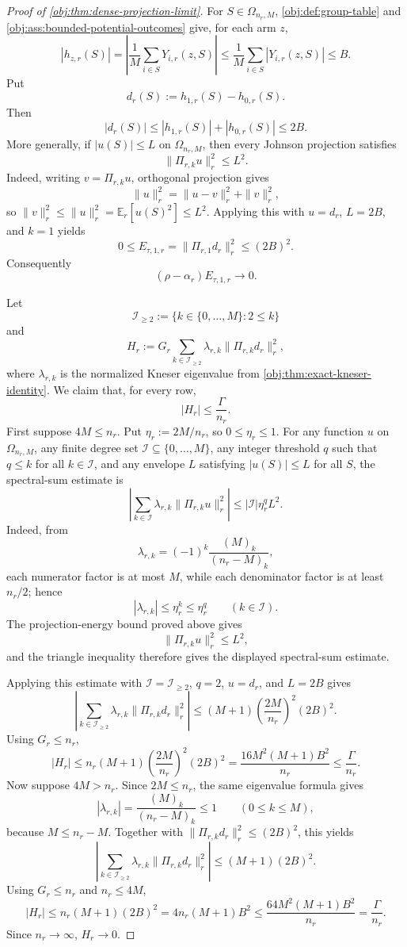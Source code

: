 \documentclass[11pt]{article}
\begin{document}
\begin{proof}[Proof of \cref{obj:thm:dense-projection-limit}]
For \(S\in\Omega_{n_r,M}\), \cref{obj:def:group-table} and \cref{obj:ass:bounded-potential-outcomes} give, for each arm \(z\),
\[
|h_{z,r}(S)|
=
\left|
\frac1M\sum_{i\in S}Y_{i,r}(z,S)
\right|
\le
\frac1M\sum_{i\in S}|Y_{i,r}(z,S)|
\le B .
\]
Put
\[
d_r(S):=h_{1,r}(S)-h_{0,r}(S).
\]
Then
\[
|d_r(S)|\le |h_{1,r}(S)|+|h_{0,r}(S)|\le 2B .
\]
More generally, if \(|u(S)|\le L\) on \(\Omega_{n_r,M}\), then every Johnson projection satisfies
\[
\|\Pi_{r,k}u\|_r^2\le L^2 .
\]
Indeed, writing \(v=\Pi_{r,k}u\), orthogonal projection gives
\[
\|u\|_r^2=\|u-v\|_r^2+\|v\|_r^2,
\]
so \(\|v\|_r^2\le \|u\|_r^2=\mathbb E_r[u(S)^2]\le L^2\).  Applying this with \(u=d_r\), \(L=2B\), and \(k=1\) yields
\[
0\le E_{\tau,1,r}
=
\|\Pi_{r,1}d_r\|_r^2
\le (2B)^2 .
\]
Consequently
\[
(\rho-\alpha_r)E_{\tau,1,r}\to0 .
\]

Let
\[
\mathcal I_{\ge2}:=\{k\in\{0,\ldots,M\}:2\le k\}
\]
and
\[
H_r:=
G_r\sum_{k\in\mathcal I_{\ge2}}\lambda_{r,k}\|\Pi_{r,k}d_r\|_r^2 ,
\]
where \(\lambda_{r,k}\) is the normalized Kneser eigenvalue from \cref{obj:thm:exact-kneser-identity}.  We claim that, for every row,
\[
|H_r|\le \frac{\Gamma}{n_r}.
\]
First suppose \(4M\le n_r\).  Put \(\eta_r:=2M/n_r\), so \(0\le\eta_r\le1\).  For any function \(u\) on \(\Omega_{n_r,M}\), any finite degree set \(\mathcal I\subseteq\{0,\ldots,M\}\), any integer threshold \(q\) such that \(q\le k\) for all \(k\in\mathcal I\), and any envelope \(L\) satisfying \(|u(S)|\le L\) for all \(S\), the spectral-sum estimate is
\[
\left|
\sum_{k\in\mathcal I}\lambda_{r,k}\|\Pi_{r,k}u\|_r^2
\right|
\le
|\mathcal I|\eta_r^qL^2 .
\]
Indeed, from
\[
\lambda_{r,k}=(-1)^k\frac{(M)_k}{(n_r-M)_k},
\]
each numerator factor is at most \(M\), while each denominator factor is at least \(n_r/2\); hence
\[
|\lambda_{r,k}|\le\eta_r^k\le\eta_r^q
\qquad (k\in\mathcal I).
\]
The projection-energy bound proved above gives
\[
\|\Pi_{r,k}u\|_r^2\le L^2,
\]
and the triangle inequality therefore gives the displayed spectral-sum estimate.

Applying this estimate with \(\mathcal I=\mathcal I_{\ge2}\), \(q=2\), \(u=d_r\), and \(L=2B\) gives
\[
\left|
\sum_{k\in\mathcal I_{\ge2}}\lambda_{r,k}\|\Pi_{r,k}d_r\|_r^2
\right|
\le
(M+1)\left(\frac{2M}{n_r}\right)^2(2B)^2 .
\]
Using \(G_r\le n_r\),
\[
|H_r|
\le
n_r(M+1)\left(\frac{2M}{n_r}\right)^2(2B)^2
=
\frac{16M^2(M+1)B^2}{n_r}
\le
\frac{\Gamma}{n_r}.
\]
Now suppose \(4M>n_r\).  Since \(2M\le n_r\), the same eigenvalue formula gives
\[
|\lambda_{r,k}|=\frac{(M)_k}{(n_r-M)_k}\le1
\qquad (0\le k\le M),
\]
because \(M\le n_r-M\).  Together with \(\|\Pi_{r,k}d_r\|_r^2\le(2B)^2\), this yields
\[
\left|
\sum_{k\in\mathcal I_{\ge2}}\lambda_{r,k}\|\Pi_{r,k}d_r\|_r^2
\right|
\le
(M+1)(2B)^2 .
\]
Using \(G_r\le n_r\) and \(n_r\le4M\),
\[
|H_r|
\le
n_r(M+1)(2B)^2
=4n_r(M+1)B^2
\le
\frac{64M^2(M+1)B^2}{n_r}
=
\frac{\Gamma}{n_r}.
\]
Since \(n_r\to\infty\), \(H_r\to0\).


\end{proof}
\end{document}

